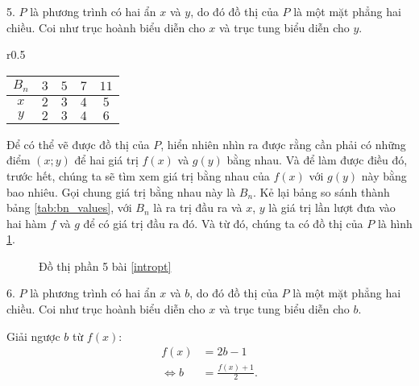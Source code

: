 5. $P$ là phương trình có hai ẩn $x$ và $y$, do đó đồ thị của $P$ là một mặt phẳng hai chiều. Coi như trục hoành biểu diễn cho $x$ và trục tung biểu diễn cho $y$. 

\begin{wraptable}{r}{0.5\textwidth}
   \centering
   \begin{tabular}{|c|c|c|c|c|}
      \hline
      $B_n$ & $3$ & $5$ & $7$ & $11$ \\
      \hline
      $x$ & $2$ & $3$ & $4$ & $5$ \\
      \hline
      $y$ & $2$ & $3$ & $4$ & $6$ \\
      \hline 
   \end{tabular}
   \caption{Giá trị của $x$ và $y$ ứng với $B_n$}
   \label{tab:bn_values}
\end{wraptable}

Để có thể vẽ được đồ thị của $P$, hiển nhiên nhìn ra được rằng cần phải có những điểm $(x;y)$ để hai giá trị $f(x)$ và $g(y)$ bằng nhau. Và để làm được điều đó, trước hết, chúng ta sẽ tìm xem giá trị bằng nhau của $f(x)$ với $g(y)$ này bằng bao nhiêu. Gọi chung giá trị bằng nhau này là $B_n$. Kẻ lại bảng so sánh thành bảng \ref{tab:bn_values}, với $B_n$ là ra trị đầu ra và $x$, $y$ là giá trị lần lượt đưa vào hai hàm $f$ và $g$ để có giá trị đầu ra đó. Và từ đó, chúng ta có đồ thị của $P$ là hình \ref{fig:dtp5}.

\begin{figure}[h]
   \centering
   \caption{Đồ thị phần 5 bài \ref{intropt}}
   \label{fig:dtp5}
\end{figure}

6. $P$ là phương trình có hai ẩn $x$ và $b$, do đó đồ thị của $P$ là một mặt phẳng hai chiều. Coi như trục hoành biểu diễn cho $x$ và trục tung biểu diễn cho $b$.

Giải ngược $b$ từ $f(x)$:
\begin{align*}
   f(x) &= 2b - 1 \\
   \iff b &= \frac{f(x) + 1}{2}.
\end{align*}

